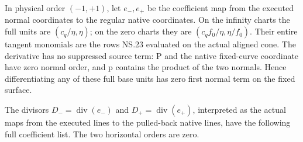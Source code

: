 In physical order \((-1,+1)\), let \(e_-,e_+\) be the coefficient
map from the executed normal coordinates to the regular native
coordinates. On the infinity charts the full units are
\((c_q/\eta,\eta)\); on the zero charts they are
\((c_qf_0/\eta,\eta/f_0)\). Their entire tangent monomials are
the rows NS.23 evaluated on the actual aligned cone. The derivative
has no suppressed source term: P and the native fixed-curve
coordinate have zero normal order, and p contains the product of
the two normals. Hence differentiating any of these full base units
has zero first normal term on the fixed surface.

The divisors \(D_- =\operatorname{div}(e_-)\) and
\(D_+ =\operatorname{div}(e_+)\), interpreted as the actual maps
from the executed lines to the pulled-back native lines, have the
following full coefficient list. The two horizontal orders are zero.

